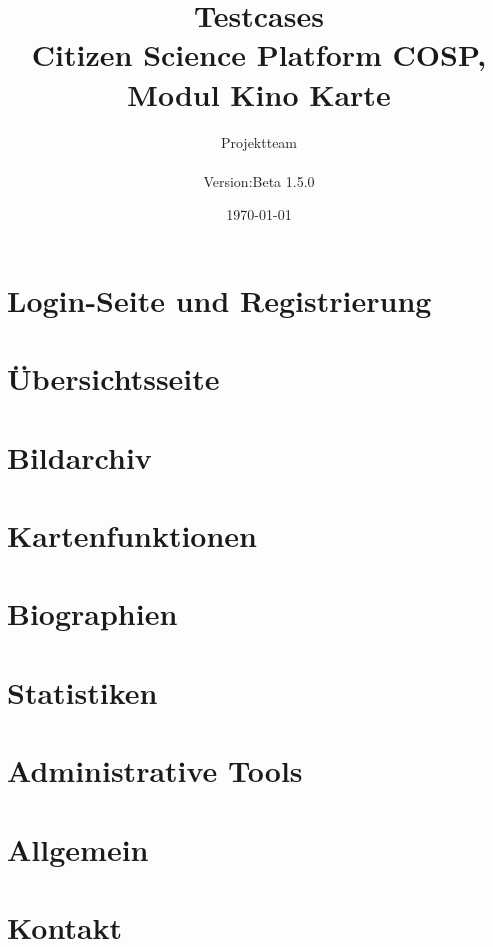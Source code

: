 \documentclass[a4paper, 10pt, oneside, draft]{article}
\begin{document}
\title{Testcases \\ \normalsize{Citizen Science Platform {\glqq COSP\grqq}, Modul {\glqq Kino Karte\grqq}} }
\date{\today}
\author{Projektteam \\
	\normalsize{
		\begin{tabular}[t]{ll}
			Version:  & \quad Beta 1.5.0 \\[1.2ex]
		\end{tabular}
	}
}
\maketitle

\newpage
\tableofcontents
\newpage
\setcounter{page}{1}
\section{Login-Seite und Registrierung}

\newpage
\section{Übersichtsseite}

\newpage
\section{Bildarchiv}

\newpage
\section{Kartenfunktionen}


\newpage
\section{Biographien}

\newpage
\section{Statistiken}

\newpage
\section{Administrative Tools}

\newpage
\section{Allgemein}

\newpage
\section{Kontakt}

\end{document}
